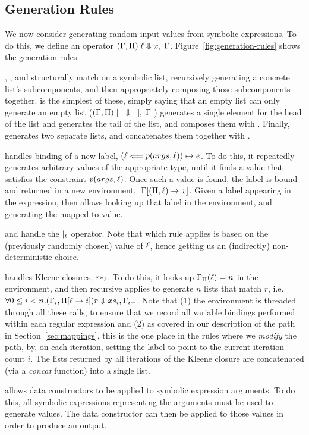 \subsection{Generation Rules} \label{subsec:generation-rules}



\par 
We now consider generating random input values from symbolic expressions. 
To do this, we define an operator $(\Gamma, \Pi) \; \ell \Downarrow x, \; \Gamma$. 
Figure~\ref{fig:generation-rules}
shows the generation rules.

\RuleEmpty, \RuleCons, and \RuleConcat
structurally match on a symbolic list,
recursively generating a concrete list's subcomponents,
and then appropriately composing those subcomponents together.
\RuleEmpty is the simplest of these,
simply saying that an empty list
can only generate an empty list
($(\Gamma, \Pi) \; [\;] \Downarrow [\;], \; \Gamma$.)
\RuleCons generates a single element
for the head of the list
and generates the tail of the list,
and composes them with \cons.
Finally, \RuleConcat generates
two separate lists,
and concatenates them together with \concat.



\RuleAssign
handles binding of a new label,
$(\ell \Longleftarrow p(args, \ell)) \mapsto e$.
To do this,
it repeatedly generates arbitrary values of the appropriate type,
until it finds a value that satisfies the constraint $p(args, \ell)$.
Once such a value is found,
the label is bound and returned in a new environment,
$\; \Gamma [(\Pi, \ell) \rightarrow x]$.
Given a label appearing in the expression,
\RuleVariable then allows looking up that label in the environment,
and generating the mapped-to value.

\RuleUnionLeft and \RuleUnionRight
handle the $|_\ell$ operator.
Note that which rule applies
is based on the (previously randomly chosen)
value of $\ell$,
hence getting us an (indirectly) non-deterministic choice.

\RuleStar handles Kleene closures, $r*_\ell$.
To do this, it looks up $\Gamma_\Pi(\ell) = n$ in the environment,
and then recursive applies \gens to generate $n$ lists that match $r$,
i.e.
$\forall 0 \leq i < n . (\Gamma_{i}, \Pi [\ell \rightarrow i]) r \Downarrow xs_i, \Gamma_{i + }$.
Note that (1) the environment is threaded through all these calls,
to ensure that we record all variable bindings performed within each regular expression
and (2) as covered in our description of the path in Section~\ref{sec:mappings},
this is the one place in the rules where we \textit{modify} the path,
by, on each iteration, setting the label \lab to point to the current iteration count $i$.
The lists returned by all iterations of the Kleene closure are concatenated (via a \textit{concat} function)
into a single list.

\RuleApply allows data constructors to be applied to symbolic expression arguments.
To do this, all symbolic expressions representing the arguments
must be used to generate values.
The data constructor can then be applied to those values in order to produce an output.
